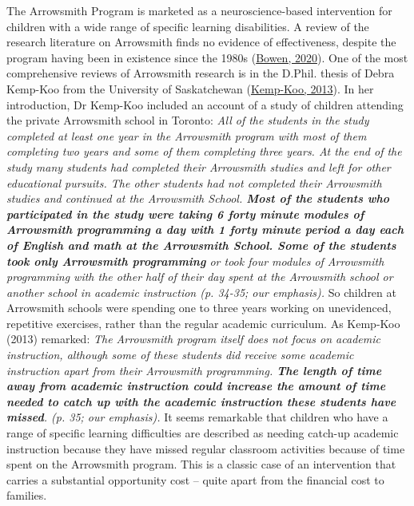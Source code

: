 \documentclass{krantz}
\begin{document}
\begin{tcolorbox}[colback=Black!5!lightgray,colframe=black!75!black,coltitle=white,title=Opportunity Costs in the Arrowsmith Program]\label{box:Arrowsmith}
The Arrowsmith Program is marketed as a neuroscience-based intervention for children with a wide range of specific learning disabilities. A review of the research literature on Arrowsmith finds no evidence of effectiveness, despite the program having been in existence since the 1980s (\protect\hyperlink{ref-bowen2020}{Bowen, 2020}). One of the most comprehensive reviews of Arrowsmith research is in the D.Phil. thesis of Debra Kemp-Koo from the University of Saskatchewan (\protect\hyperlink{ref-kemp-koo2013}{Kemp-Koo, 2013}). In her introduction, Dr Kemp-Koo included an account of a study of children attending the private Arrowsmith school in Toronto: \textit{All of the students in the study completed at least one year in the Arrowsmith program with most of them completing two years and some of them completing three years. At the end of the study many students had completed their Arrowsmith studies and left for other educational pursuits. The other students had not completed their Arrowsmith studies and continued at the Arrowsmith School. \textbf{Most of the students who participated in the study were taking 6 forty minute modules of Arrowsmith programming a day with 1 forty minute period a day each of English and math at the Arrowsmith School. Some of the students took only Arrowsmith programming} or took four modules of Arrowsmith programming with the other half of their day spent at the Arrowsmith school or another school in academic instruction (p. 34-35; our emphasis).}
So children at Arrowsmith schools were spending one to three years working on unevidenced, repetitive exercises, rather than the regular academic curriculum. As Kemp-Koo (2013) remarked: \textit{The Arrowsmith program itself does not focus on academic instruction, although some of these students did receive some academic instruction apart from their Arrowsmith programming. \textbf{The length of time away from academic instruction could increase the amount of time needed to catch up with the academic instruction these students have missed}. (p. 35; our emphasis).}  
It seems remarkable that children who have a range of specific learning difficulties are described as needing catch-up academic instruction because they have missed regular classroom activities because of time spent on the Arrowsmith program. This is a classic case of an intervention that carries a substantial opportunity cost -- quite apart from the financial cost to families.  
\end{tcolorbox}
\end{document}
